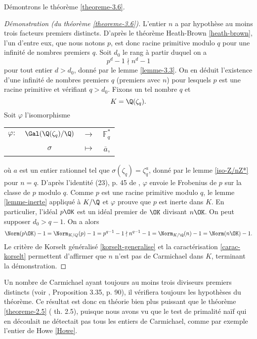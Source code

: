 Démontrons le théorème \ref{theoreme-3.6}.

\begin{proof}[Démonstration (du théorème \ref{theoreme-3.6})]
	L'entier $n$ a par hypothèse au moins trois facteurs premiers distincts. D'après le théorème Heath-Brown \ref{heath-brown}, l'un d'entre eux, que nous notons $p$, est donc racine primitive modulo $q$ pour une infinité de nombres premiers $q$. Soit $d_0$ le rang à partir duquel on a \[p^d - 1 \nmid n^d - 1\] pour tout entier $d>d_0$, donné par le lemme \ref{lemme-3.3}. On en déduit l'existence d'une infinité de nombres premiers $q$ (premiers avec $n$) pour lesquels $p$ est une racine primitive et vérifiant $q>d_0$. Fixons un tel nombre $q$ et \[K = \Q(\zeta_q).\] Soit $\varphi$ l'isomorphisme
\begin{center}
	\begin{tabular}{cccc}
		$\varphi :$ & $\Gal(\Q(\zeta_q)/\Q)$ & $\longrightarrow$ & $\mathbb{F}_q^*$ \\
		&$\sigma$	& $\longmapsto$ & $\overline{a}$,
	\end{tabular}
\end{center}
où $a$ est un entier rationnel tel que $\sigma(\zeta_q) = \zeta_q^a$, donné par le lemme \ref{iso-Z/nZ*} pour $n=q$. D'après l'identité (23), p. 45 de \cite{Kraus}, $\varphi$ envoie le Frobenius de $p$ sur la classe de $p$ modulo $q$. Comme $p$ est une racine primitive modulo $q$, le lemme \ref{lemme-inerte} appliqué à $K/\Q$ et $\varphi$ prouve que $p$ est inerte dans $K$. En particulier, l'idéal $p\OK$ est un idéal premier de $\OK$ divisant $n\OK$. On peut supposer $d_0 > q-1$. On a alors \[ \Norm(p\OK) - 1 = \Norm_{K/Q}(p) - 1 = p^{q-1} - 1 \nmid n^{q-1} - 1 = \Norm_{K/\Q}(n) - 1 = \Norm(n\OK) - 1.\] Le critère de Korselt généralisé \ref{korselt-generalise} et la caractérisation \ref{carac-korselt} permettent d'affirmer que $n$ n'est pas de Carmichael dans $K$, terminant la démonstration.

\end{proof}

Un nombre de Carmichael ayant toujours au moins trois diviseurs premiers distincts (voir \cite{Demazure}, Proposition 3.35, p. 90), il vérifiera toujours les hypothèses du théorème. Ce résultat est donc en théorie bien plus puissant que le théorème \ref{theoreme-2.5} (\cite{article} th. 2.5), puisque nous avons vu que le test de primalité naïf qui en découlait ne détectait pas tous les entiers de Carmichael, comme par exemple l'entier de Howe \ref{Howe}. 

